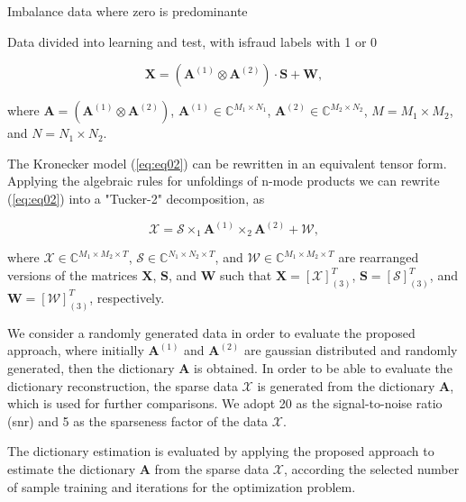 Imbalance data where zero is predominante

Data divided into learning and test, with isfraud labels with 1 or 0

\begin{equation}\label{eq:eq02}
\boldsymbol{X} = (\boldsymbol{A}^{(1)} \otimes \boldsymbol{A}^{(2)}) \cdot \boldsymbol{S} + \boldsymbol{W},
\end{equation}

where $\boldsymbol{A} = (\boldsymbol{A}^{(1)} \otimes \boldsymbol{A}^{(2)})$, $\boldsymbol{A}^{(1)} \in \mathbb{C}^{M_1 \times N_1}$, $\boldsymbol{A}^{(2)} \in \mathbb{C}^{M_2 \times N_2}$, $M = M_1 \times M_2$, and $N = N_1 \times N_2$.

The Kronecker model (\ref{eq:eq02}) can be rewritten in an equivalent tensor form. Applying the algebraic rules for unfoldings of n-mode products \cite{roemer2014tensor} we can rewrite (\ref{eq:eq02}) into a "Tucker-2" decomposition, as

\begin{equation}\label{eq:eq03}
\boldsymbol{\mathcal{X}} = \boldsymbol{\mathcal{S}} \times_1 \boldsymbol{A}^{(1)} \times_2 \boldsymbol{A}^{(2)} +  \boldsymbol{\mathcal{W}},
\end{equation}

where $\boldsymbol{\mathcal{X}} \in \mathbb{C}^{M_1 \times M_2 \times T}$, $\boldsymbol{\mathcal{S}} \in \mathbb{C}^{N_1 \times N_2 \times T}$, and $\boldsymbol{\mathcal{W}} \in \mathbb{C}^{M_1 \times M_2 \times T}$ are rearranged versions of the matrices $\boldsymbol{X}$, $\boldsymbol{S}$, and $\boldsymbol{W}$ such that $\boldsymbol{X} = [\boldsymbol{\mathcal{X}}]_{(3)}^T$, $\boldsymbol{S} = [\boldsymbol{\mathcal{S}}]_{(3)}^T$, and $\boldsymbol{W} = [\boldsymbol{\mathcal{W}}]_{(3)}^T$, respectively.

We consider a randomly generated data in order to evaluate the proposed approach, where initially $\boldsymbol{A}^{(1)}$ and $\boldsymbol{A}^{(2)}$ are gaussian distributed and randomly generated, then the dictionary $\boldsymbol{A}$ is obtained. In order to be able to evaluate the dictionary reconstruction, the sparse data $\boldsymbol{\mathcal{X}}$ is generated from the dictionary $\boldsymbol{A}$, which is used for further comparisons. We adopt 20 as the signal-to-noise ratio (snr) and 5 as the sparseness factor of the data $\boldsymbol{\mathcal{X}}$. 

The dictionary estimation is evaluated by applying the proposed approach to estimate the dictionary $\boldsymbol{A}$ from the sparse data $\boldsymbol{\mathcal{X}}$, according the selected number of sample training and iterations for the optimization problem.


